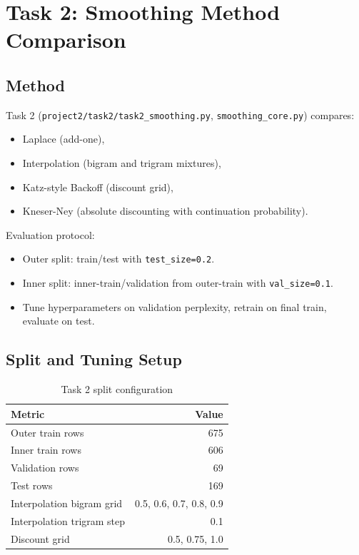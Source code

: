 \documentclass[10pt,a4paper]{article}
\begin{document}
\section{Task 2: Smoothing Method Comparison}

\subsection{Method}
Task 2 (\texttt{project2/task2/task2\_smoothing.py}, \texttt{smoothing\_core.py}) compares:
\begin{itemize}
    \item Laplace (add-one),
    \item Interpolation (bigram and trigram mixtures),
    \item Katz-style Backoff (discount grid),
    \item Kneser-Ney (absolute discounting with continuation probability).
\end{itemize}

Evaluation protocol:
\begin{itemize}
    \item Outer split: train/test with \texttt{test\_size=0.2}.
    \item Inner split: inner-train/validation from outer-train with \texttt{val\_size=0.1}.
    \item Tune hyperparameters on validation perplexity, retrain on final train, evaluate on test.
\end{itemize}

\subsection{Split and Tuning Setup}
\begin{table}[H]
\centering
\caption{Task 2 split configuration}
\label{tab:task2-split}
\begin{tabular}{lr}
\toprule
\textbf{Metric} & \textbf{Value} \\
\midrule
Outer train rows & 675 \\
Inner train rows & 606 \\
Validation rows & 69 \\
Test rows & 169 \\
Interpolation bigram grid & 0.5, 0.6, 0.7, 0.8, 0.9 \\
Interpolation trigram step & 0.1 \\
Discount grid & 0.5, 0.75, 1.0 \\
\bottomrule
\end{tabular}
\end{table}
\end{document}

